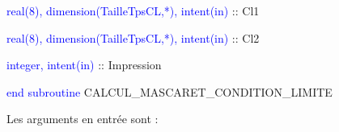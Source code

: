 \documentclass[a4paper,11pt]{article}
\begin{document}
        \hspace{1cm} \textcolor{blue}{real(8), dimension(TailleTpsCL,*), intent(in)}  :: Cl1
        
        \hspace{1cm} \textcolor{blue}{real(8), dimension(TailleTpsCL,*), intent(in)}  :: Cl2
        
        \hspace{1cm} \textcolor{blue}{integer, intent(in)}  :: Impression
        
    \textcolor{blue}{end subroutine} CALCUL\_MASCARET\_CONDITION\_LIMITE

 \vspace{0.5cm}
 
 Les arguments en entr\'ee sont :
 
 \vspace{0.5cm}
 
\end{document}
